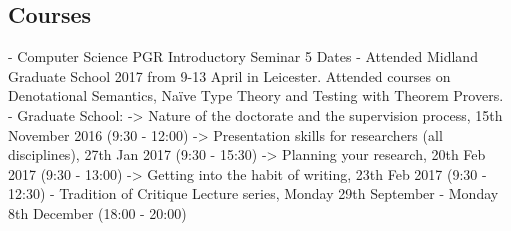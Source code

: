 \subsection{Courses}
- Computer Science PGR Introductory Seminar 5 Dates
- Attended Midland Graduate School 2017 from 9-13 April in Leicester. Attended courses on Denotational Semantics, Naïve Type Theory and Testing with Theorem Provers.
- Graduate School: 
	-> Nature of the doctorate and the supervision process, 15th November 2016 (9:30 - 12:00)
	-> Presentation skills for researchers (all disciplines), 27th Jan 2017 (9:30 - 15:30)
	-> Planning your research, 20th Feb 2017 (9:30 - 13:00)
	-> Getting into the habit of writing, 23th Feb 2017 (9:30 - 12:30)
- Tradition of Critique Lecture series, Monday 29th September - Monday 8th December (18:00 - 20:00)
